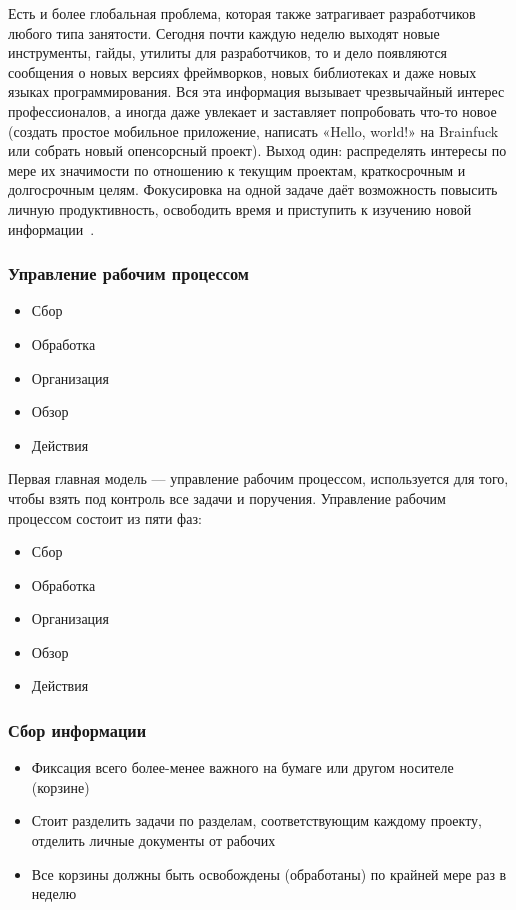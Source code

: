 \documentclass{../industrial-development}
\begin{document}
Есть и более глобальная проблема, которая также затрагивает разработчиков любого типа занятости. Сегодня почти каждую неделю выходят новые инструменты, гайды, утилиты для разработчиков, то и дело появляются сообщения о новых версиях фреймворков, новых библиотеках и даже новых языках программирования. Вся эта информация вызывает чрезвычайный интерес профессионалов, а иногда даже увлекает и заставляет попробовать что-то новое (создать простое мобильное приложение, написать «Hello, world!» на Brainfuck или собрать новый опенсорсный проект). Выход один: распределять интересы по мере их значимости по отношению к текущим проектам, краткосрочным и долгосрочным целям. Фокусировка на одной задаче даёт возможность повысить личную продуктивность, освободить время и приступить к изучению новой информации~\cite{GTDHabr}.

\begin{frame} \frametitle{Управление рабочим процессом}
  \begin{itemize}
  \item Сбор
  \item Обработка
  \item Организация
  \item Обзор
  \item Действия
  \end{itemize}
\end{frame}

\lecturenotes

Первая главная модель — управление рабочим процессом, используется для того, чтобы взять под контроль все задачи и поручения. Управление рабочим процессом состоит из пяти фаз:
\begin{itemize}
\item Сбор
\item Обработка
\item Организация
\item Обзор
\item Действия~\cite{GTDWikipedia}
\end{itemize}

\begin{frame} \frametitle{Сбор информации}
  \begin{itemize}
  \item Фиксация всего более-менее важного на бумаге или другом носителе (корзине)
  \item Стоит разделить задачи по разделам, соответствующим каждому проекту, отделить личные документы от рабочих
  \item Все корзины должны быть освобождены (обработаны) по крайней мере раз в неделю
  \end{itemize}
\end{frame}
\end{document}
